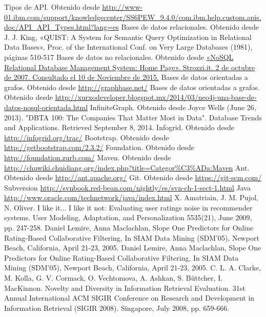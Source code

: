 \begin{thebibliography}{99}
   Tipos de API. Obtenido desde \url{http://www-01.ibm.com/support/knowledgecenter/SS6PEW_9.4.0/com.ibm.help.custom.apis.doc/API_API_Types.html?lang=es}
   Bases de datos relacionales. Obtenido desde J. J. King, «QUIST: A System for Semantic Query Optimization in Relational Data Bases», Proc. of the International Conf. on Very Large Databases (1981),
páginas 510-517
   Bases de datos no relacionales. Obtenido desde \url{ «NoSQL Relational Database Management System: Home Page». Strozzi.it. 2 de octubre de 2007. Consultado el 10 de Noviembre de 2015.}
   Bases de datos orientadas a grafos. Obtenido desde \url{ http://graphbase.net/}
   Bases de datos orientadas a grafos. Obtenido desde \url{ http://xurxodeveloper.blogspot.mx/2014/03/neo4j-una-base-de-datos-nosql-orientada.html}
   InfiniteGraph. Obtenido desde  Joyce Wells (June 26, 2013). "DBTA 100: The Companies That Matter Most in Data". Database Trends and Applications. Retrieved September 8, 2014.
   Infogrid. Obtenido desde  \url{http://infogrid.org/trac/}
   Bootstrap. Obtenido desde  \url{http://getbootstrap.com/2.3.2/}
   Foundation. Obtenido desde  \url{http://foundation.zurb.com/}
   Maven. Obtenido desde  \url{http://chuwiki.chuidiang.org/index.php?title=Categor%C3%ADa:Maven}
   Ant. Obtenido desde  \url{http://ant.apache.org/}
   Git. Obtenido desde  \url{https://git-scm.com/}
   Subversion \url{http://svnbook.red-bean.com/nightly/es/svn-ch-1-sect-1.html}
   Java \url{http://www.oracle.com/technetwork/java/index.html}
   X. Amatriain, J. M. Pujol, N. Oliver. I like it... I like it not: Evaluating user ratings noise in recommender systems. User Modeling, Adaptation, and Personalization 5535(21), June 2009, pp. 247-258.
    Daniel Lemire, Anna Maclachlan, Slope One Predictors for Online Rating-Based Collaborative Filtering, In SIAM Data Mining (SDM'05), Newport Beach, California, April 21-23, 2005.
    Daniel Lemire, Anna Maclachlan, Slope One Predictors for Online Rating-Based Collaborative Filtering, In SIAM Data Mining (SDM'05), Newport Beach, California, April 21-23, 2005.
   C. L. A. Clarke, M. Kolla, G. V. Cormack, O. Vechtomova, A. Ashkan, S. Büttcher, I. MacKinnon. Novelty and Diversity in Information Retrieval Evaluation. 31st Annual International ACM SIGIR Conference on Research and Development in Information Retrieval (SIGIR 2008). Singapore, July 2008, pp. 659-666.


\end{thebibliography}


